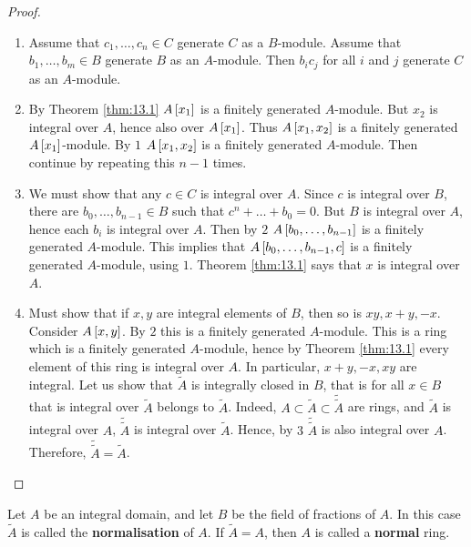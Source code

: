 \begin{proof}
\hfill
\begin{enumerate}
\item Assume that $ c_1, \dots, c_n \in C $ generate $ C $ as a $ B $-module. Assume that $ b_1, \dots, b_m \in B $ generate $ B $ as an $ A $-module. Then $ b_ic_j $ for all $ i $ and $ j $ generate $ C $ as an $ A $-module.
\item By Theorem \ref{thm:13.1} $ A\sb{x_1} $ is a finitely generated $ A $-module. But $ x_2 $ is integral over $ A $, hence also over $ A\sb{x_1} $. Thus $ A\sb{x_1, x_2} $ is a finitely generated $ A\sb{x_1} $-module. By $ 1 $ $ A\sb{x_1, x_2} $ is a finitely generated $ A $-module. Then continue by repeating this $ n - 1 $ times.
\item We must show that any $ c \in C $ is integral over $ A $. Since $ c $ is integral over $ B $, there are $ b_0, \dots, b_{n - 1} \in B $ such that $ c^n + \dots + b_0 = 0 $. But $ B $ is integral over $ A $, hence each $ b_i $ is integral over $ A $. Then by $ 2 $ $ A\sb{b_0, \dots, b_{n - 1}} $ is a finitely generated $ A $-module. This implies that $ A\sb{b_0, \dots, b_{n - 1}, c} $ is a finitely generated $ A $-module, using $ 1 $. Theorem \ref{thm:13.1} says that $ x $ is integral over $ A $.
\item Must show that if $ x, y $ are integral elements of $ B $, then so is $ xy, x + y, -x $. Consider $ A\sb{x, y} $. By $ 2 $ this is a finitely generated $ A $-module. This is a ring which is a finitely generated $ A $-module, hence by Theorem \ref{thm:13.1} every element of this ring is integral over $ A $. In particular, $ x + y, -x, xy $ are integral. Let us show that $ \widetilde{A} $ is integrally closed in $ B $, that is for all $ x \in B $ that is integral over $ \widetilde{A} $ belongs to $ \widetilde{A} $. Indeed, $ A \subset \widetilde{A} \subset \widetilde{\widetilde{A}} $ are rings, and $ \widetilde{A} $ is integral over $ A $, $ \widetilde{\widetilde{A}} $ is integral over $ \widetilde{A} $. Hence, by $ 3 $ $ \widetilde{\widetilde{A}} $ is also integral over $ A $. Therefore, $ \widetilde{\widetilde{A}} = \widetilde{A} $.
\end{enumerate}
\end{proof}


\begin{definition}
Let $ A $ be an integral domain, and let $ B $ be the field of fractions of $ A $. In this case $ \widetilde{A} $ is called the \textbf{normalisation} of $ A $. If $ \widetilde{A} = A $, then $ A $ is called a \textbf{normal} ring.
\end{definition}


